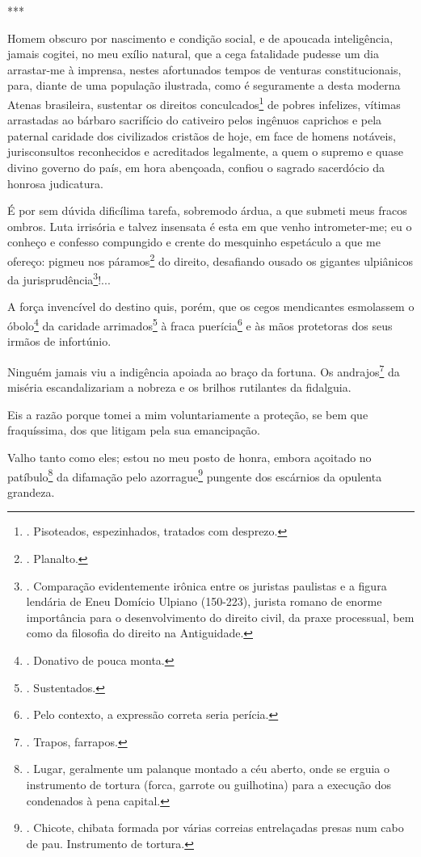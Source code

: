 ***

Homem obscuro por nascimento e condição social, e de apoucada
inteligência, jamais cogitei, no meu exílio natural, que a cega
fatalidade pudesse um dia arrastar-me à imprensa, nestes afortunados
tempos de venturas constitucionais, para, diante de uma população
ilustrada, como é seguramente a desta moderna Atenas brasileira,
sustentar os direitos conculcados\footnote{. Pisoteados, espezinhados,
  tratados com desprezo.} de pobres infelizes, vítimas arrastadas ao
bárbaro sacrifício do cativeiro pelos ingênuos caprichos e pela paternal
caridade dos civilizados cristãos de hoje, em face de homens notáveis,
jurisconsultos reconhecidos e acreditados legalmente, a quem o supremo e
quase divino governo do país, em hora abençoada, confiou o sagrado
sacerdócio da honrosa judicatura.

É por sem dúvida dificílima tarefa, sobremodo árdua, a que submeti meus
fracos ombros. Luta irrisória e talvez insensata é esta em que venho
intrometer-me; eu o conheço e confesso compungido e crente do mesquinho
espetáculo a que me ofereço: pigmeu nos páramos\footnote{. Planalto.} do
direito, desafiando ousado os gigantes ulpiânicos da
jurisprudência\footnote{. Comparação evidentemente irônica entre os
  juristas paulistas e a figura lendária de Eneu Domício Ulpiano
  (150-223), jurista romano de enorme importância para o desenvolvimento
  do direito civil, da praxe processual, bem como da filosofia do
  direito na Antiguidade.}!...

A força invencível do destino quis, porém, que os cegos mendicantes
esmolassem o óbolo\footnote{. Donativo de pouca monta.} da caridade
arrimados\footnote{. Sustentados.} à fraca puerícia\footnote{. Pelo
  contexto, a expressão correta seria perícia.} e às mãos protetoras dos
seus irmãos de infortúnio.

Ninguém jamais viu a indigência apoiada ao braço da fortuna. Os
andrajos\footnote{. Trapos, farrapos.} da miséria escandalizariam a
nobreza e os brilhos rutilantes da fidalguia.

Eis a razão porque tomei a mim voluntariamente a proteção, se bem que
fraquíssima, dos que litigam pela sua emancipação.

Valho tanto como eles; estou no meu posto de honra, embora açoitado no
patíbulo\footnote{. Lugar, geralmente um palanque montado a céu aberto,
  onde se erguia o instrumento de tortura (forca, garrote ou guilhotina)
  para a execução dos condenados à pena capital.} da difamação pelo
azorrague\footnote{. Chicote, chibata formada por várias correias
  entrelaçadas presas num cabo de pau. Instrumento de tortura.} pungente
dos escárnios da opulenta grandeza.

